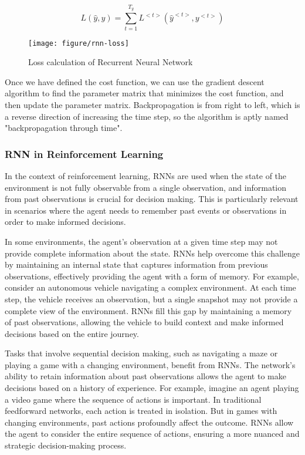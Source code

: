 \documentclass{article}
\begin{document}
\begin{equation}
L(\hat{y}, y)=\sum_{t=1}^{T_y} L^{<t>}\left(\hat{y}^{<t>}, y^{<t>}\right)
\end{equation}

\begin{figure}[htbp]
        \centering
        \texttt{[image: figure/rnn-loss]}
        \caption{Loss calculation of Recurrent Neural Network}
     \end{figure}

Once we have defined the cost function, we can use the gradient descent algorithm to find the parameter matrix that minimizes the cost function, and then update the parameter matrix. Backpropagation is from right to left, which is a reverse direction of increasing the time step, so the algorithm is aptly named "backpropagation through time". \\

\newpage
\subsubsection{RNN in Reinforcement Learning}

In the context of reinforcement learning, RNNs are used when the state of the environment is not fully observable from a single observation, and information from past observations is crucial for decision making. This is particularly relevant in scenarios where the agent needs to remember past events or observations in order to make informed decisions.

In some environments, the agent's observation at a given time step may not provide complete information about the state. RNNs help overcome this challenge by maintaining an internal state that captures information from previous observations, effectively providing the agent with a form of memory. For example, consider an autonomous vehicle navigating a complex environment. At each time step, the vehicle receives an observation, but a single snapshot may not provide a complete view of the environment. RNNs fill this gap by maintaining a memory of past observations, allowing the vehicle to build context and make informed decisions based on the entire journey.

Tasks that involve sequential decision making, such as navigating a maze or playing a game with a changing environment, benefit from RNNs. The network's ability to retain information about past observations allows the agent to make decisions based on a history of experience. For example, imagine an agent playing a video game where the sequence of actions is important. In traditional feedforward networks, each action is treated in isolation. But in games with changing environments, past actions profoundly affect the outcome. RNNs allow the agent to consider the entire sequence of actions, ensuring a more nuanced and strategic decision-making process. \\
\end{document}
